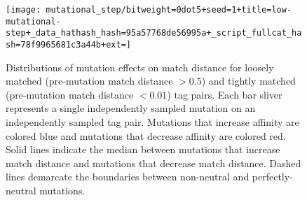 \begin{figure}
\begin{center}

\texttt{[image: mutational\_step/bitweight=0dot5+seed=1+title=low-mutational-step+\_data\_hathash\_hash=95a57768de56995a+\_script\_fullcat\_hash=78f9965681c3a44b+ext=]}
\caption{
Distributions of mutation effects on match distance for loosely matched (pre-mutation match distance $> 0.5$) and tightly matched (pre-mutation match distance $< 0.01$) tag pairs.
Each bar sliver represents a single independently sampled mutation on an independently sampled tag pair.
Mutations that increase affinity are colored blue and mutations that decrease affinity are colored red.
Solid lines indicate the median between mutations that increase match distance and mutations that decrease match distance.
Dashed lines demarcate the boundaries between non-neutral and perfectly-neutral mutations.
}
\label{fig:mutational_step}

\end{center}
\end{figure}
